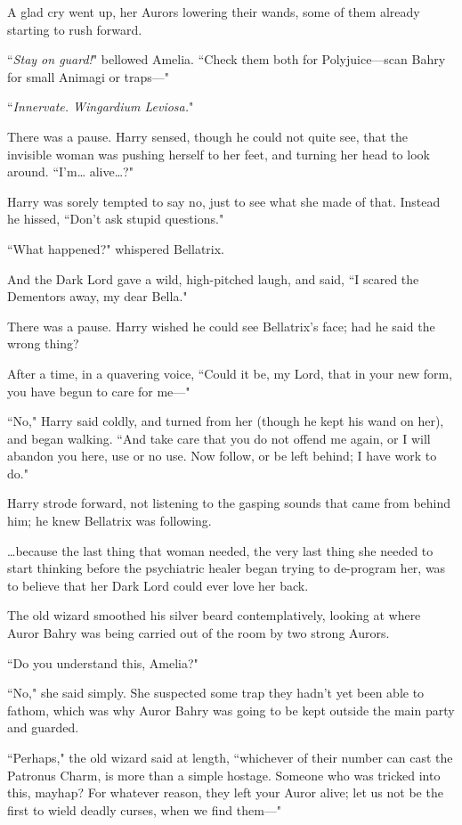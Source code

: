 A glad cry went up, her Aurors lowering their wands, some of them already starting to rush forward.

``\emph{Stay on guard!}" bellowed Amelia. ``Check them both for Polyjuice---scan Bahry for small Animagi or traps---"

\later

``\emph{Innervate. Wingardium Leviosa.}"

There was a pause. Harry sensed, though he could not quite see, that the invisible woman was pushing herself to her feet, and turning her head to look around. ``I'm{\ldots} alive{\ldots}?"

Harry was sorely tempted to say no, just to see what she made of that. Instead he hissed, ``Don't ask stupid questions."

``What happened?" whispered Bellatrix.

And the Dark Lord gave a wild, high-pitched laugh, and said, ``I scared the Dementors away, my dear Bella."

There was a pause. Harry wished he could see Bellatrix's face; had he said the wrong thing?

After a time, in a quavering voice, ``Could it be, my Lord, that in your new form, you have begun to care for me---"

``No," Harry said coldly, and turned from her (though he kept his wand on her), and began walking. ``And take care that you do not offend me again, or I will abandon you here, use or no use. Now follow, or be left behind; I have work to do."

Harry strode forward, not listening to the gasping sounds that came from behind him; he knew Bellatrix was following.

{\ldots}because the last thing that woman needed, the very last thing she needed to start thinking before the psychiatric healer began trying to de-program her, was to believe that her Dark Lord could ever love her back.

\later

The old wizard smoothed his silver beard contemplatively, looking at where Auror Bahry was being carried out of the room by two strong Aurors.

``Do you understand this, Amelia?"

``No," she said simply. She suspected some trap they hadn't yet been able to fathom, which was why Auror Bahry was going to be kept outside the main party and guarded.

``Perhaps," the old wizard said at length, ``whichever of their number can cast the Patronus Charm, is more than a simple hostage. Someone who was tricked into this, mayhap? For whatever reason, they left your Auror alive; let us not be the first to wield deadly curses, when we find them---"

